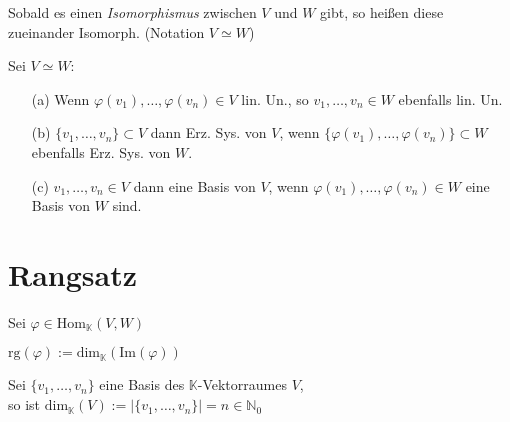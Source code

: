\documentclass[12pt, a4paper]{report}
\theoremstyle{definition}
\begin{document}
\begin{defi}
  Sobald es einen \textit{Isomorphismus} zwischen $V$ und $W$ gibt,
  so heißen diese zueinander Isomorph. (Notation $V \simeq W$) 
\end{defi}


\begin{lem}
  Sei $V \simeq W$:
  \begin{itemize}
    \item[(a)] Wenn $\varphi(v_{1}), \ldots, \varphi(v_{n}) \in V$ lin. Un., so $v_{1}, \ldots, v_{n} \in W$ ebenfalls lin. Un.
    \item[(b)] $\{ v_{1}, \ldots, v_{n} \} \subset V $ dann Erz. Sys. von $V$, wenn $\{ \varphi(v_{1}), \ldots, \varphi(v_{n}) \} \subset W$ \indent ebenfalls Erz. Sys. von $W$.
    \item[(c)] $v_{1}, \ldots, v_{n} \in V $ dann eine Basis von $V$, wenn $\varphi(v_{1}), \ldots, \varphi(v_{n}) \in W$ eine Basis von $W$ sind.
  \end{itemize}
\end{lem}


\section{Rangsatz}

\begin{defi}
  Sei $\varphi \in \text{Hom}_{\mathbb{K}}(V,W)$ \vspace*{0.2cm} \\
    \centerline{ $\text{rg}(\varphi) := \text{dim}_{\mathbb{K}}(\text{Im}(\varphi))$ }
\end{defi}

\begin{rem}
  Sei $\{ v_{1}, \ldots, v_{n} \}$ eine Basis des $\mathbb{K}$-Vektorraumes $V$, \\ so ist $\text{dim}_{\mathbb{K}}(V) := |\{ v_{1}, \ldots, v_{n} \}| = n \in \mathbb{N}_{0}$
\end{rem}    


  
  
\end{document}
